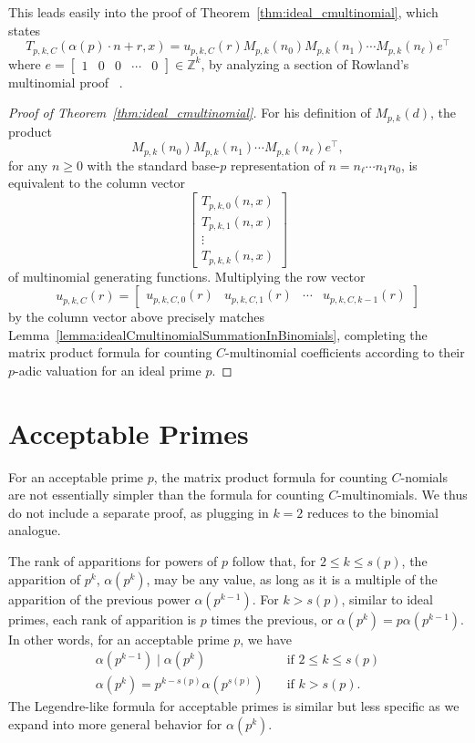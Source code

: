\documentclass{amsart}
\theoremstyle{definition}
\begin{document}
This leads easily into the proof of Theorem~\ref{thm:ideal_cmultinomial}, which states \[
T_{p,k,C}(\alpha(p) \cdot n + r, x)
= u_{p,k,C}(r) M_{p,k}(n_0) M_{p,k}(n_1) \cdots M_{p,k}(n_\ell) e^\intercal
\] where $e=\begin{bmatrix}
    1&0&0&\cdots&0
\end{bmatrix}\in\mathbb{Z}^k$, by analyzing a section of Rowland's multinomial proof ~\cite[Theorem 3]{Rowland2018}.

\begin{proof}[Proof of Theorem~\ref{thm:ideal_cmultinomial}]
For his definition of $M_{p, k}(d)$, the product $$M_{p,k}(n_0) M_{p,k}(n_1) \cdots M_{p,k}(n_\ell) e^\intercal,$$ for any $ n \geq 0 $ with the standard base-$p$ representation of $n = n_{\ell}\cdots n_1n_0$, is equivalent to the column vector \[
\begin{bmatrix}
    T_{p,k,0}(n,x)
    \\
    T_{p,k,1}(n,x)
    \\
    \vdots
    \\
    T_{p,k,k}(n,x)
\end{bmatrix}
\]
of multinomial generating functions. Multiplying the row vector $$u_{p,k,C}(r)=\begin{bmatrix}
    u_{p,k,C,0}(r)&u_{p,k,C,1}(r) & \cdots & u_{p,k,C,k-1}(r)
\end{bmatrix}$$
by the column vector above precisely matches Lemma~\ref{lemma:idealCmultinomialSummationInBinomials}, completing the matrix product formula for counting $C$-multinomial coefficients according to their $p$-adic valuation for an ideal prime $p$.
\end{proof}
\section{Acceptable Primes}\label{section:acceptable} For an acceptable prime $p$, the matrix product formula for counting $C$-nomials are not essentially simpler than the formula for counting $C$-multinomials. We thus do not include a separate proof, as plugging in $k=2$ reduces to the binomial analogue. 

The rank of apparitions for powers of $p$ follow that, for $2 \leq k \leq s(p)$, the apparition of $p^k$, $\alpha(p^k)$, may be any value, as long as it is a multiple of the apparition of the previous power $\alpha(p^{k-1})$.  For $k > s(p)$, similar to ideal primes, each rank of apparition is $p$ times the previous, or $\alpha(p^k)=p\alpha(p^{k-1})$. In other words, for an acceptable prime $p$, we have
\begin{align*}
\alpha(p^{k-1})\mid\alpha(p^k) \quad &\text{if } 2 \leq k \leq s(p) \\
\alpha(p^k)=p^{k-s(p)}\alpha(p^{s(p)}) \quad&\text{if } k > s(p).
\end{align*}
The Legendre-like formula for acceptable primes is similar but less specific as we expand into more general behavior for $\alpha(p^k)$. 
\end{document}
